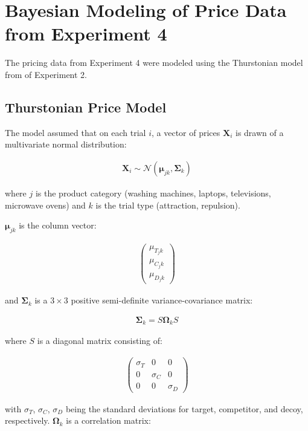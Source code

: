 \chapter{Bayesian Modeling of Price Data from Experiment 4}

The pricing data from Experiment 4 were modeled using the Thurstonian model from of Experiment 2.

\section{Thurstonian Price Model}

The model assumed that on each trial $i$, a vector of prices $\textbf{X}_{i}$ is drawn of a multivariate normal distribution:

\begin{align}
    \textbf{X}_{i}\sim \mathcal{N}(\boldsymbol{\mu}_{jk},\boldsymbol{\Sigma}_{k})
\end{align}

where $j$ is the product category (washing machines, laptops, televisions, microwave ovens) and $k$ is the trial type (attraction, repulsion). 

$\boldsymbol{\mu}_{jk}$ is the column vector:

\begin{align}
   \begin{pmatrix}
      \mu_{T_jk} \\
      \mu_{C_jk} \\
      \mu_{D_jk}
\end{pmatrix}
   \label{eqn:mu_price}
\end{align}

and $\boldsymbol{\Sigma}_{k}$ is a $3 \times 3$ positive semi-definite variance-covariance matrix:

\begin{align}
   \boldsymbol{\Sigma}_{k}=S\boldsymbol{\Omega}_{k}S
\end{align}

where $S$ is a diagonal matrix consisting of: 

\begin{align}
   \begin{pmatrix}
      \sigma_{T} & 0 & 0 \\
      0 & \sigma_{C} & 0 \\
      0 & 0 & \sigma_{D} 
   \end{pmatrix}
\end{align}

with $\sigma_{T}$, $\sigma_{C}$, $\sigma_{D}$ being the standard deviations for target, competitor, and decoy, respectively. $\boldsymbol{\Omega}_{k}$ is a correlation matrix:

